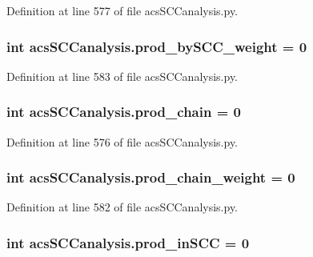 Definition at line 577 of file acs\-S\-C\-Canalysis.\-py.

\hypertarget{a00097_a5f45dbe461b3b18021c93780e87cc40e}{
\subsubsection[{prod\-\_\-by\-S\-C\-C\-\_\-weight}]{\setlength{\rightskip}{0pt plus 5cm}int acs\-S\-C\-Canalysis.\-prod\-\_\-by\-S\-C\-C\-\_\-weight = 0}}\label{a00097_a5f45dbe461b3b18021c93780e87cc40e}


Definition at line 583 of file acs\-S\-C\-Canalysis.\-py.

\hypertarget{a00097_ab307c6047e4d16ec0335266b24e7db5a}{
\subsubsection[{prod\-\_\-chain}]{\setlength{\rightskip}{0pt plus 5cm}int acs\-S\-C\-Canalysis.\-prod\-\_\-chain = 0}}\label{a00097_ab307c6047e4d16ec0335266b24e7db5a}


Definition at line 576 of file acs\-S\-C\-Canalysis.\-py.

\hypertarget{a00097_a6736365f1f19058f6e1d57287383dbcc}{
\subsubsection[{prod\-\_\-chain\-\_\-weight}]{\setlength{\rightskip}{0pt plus 5cm}int acs\-S\-C\-Canalysis.\-prod\-\_\-chain\-\_\-weight = 0}}\label{a00097_a6736365f1f19058f6e1d57287383dbcc}


Definition at line 582 of file acs\-S\-C\-Canalysis.\-py.

\hypertarget{a00097_adbc76b0558ceb74d798b35146a583474}{
\subsubsection[{prod\-\_\-in\-S\-C\-C}]{\setlength{\rightskip}{0pt plus 5cm}int acs\-S\-C\-Canalysis.\-prod\-\_\-in\-S\-C\-C = 0}}\label{a00097_adbc76b0558ceb74d798b35146a583474}


